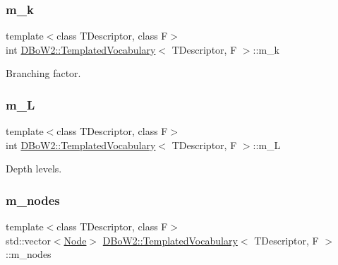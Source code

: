 \subsubsection{\texorpdfstring{m\+\_\+k}{m\_k}}
{\footnotesize\ttfamily template$<$class T\+Descriptor, class F$>$ \\
int \mbox{\hyperlink{class_d_bo_w2_1_1_templated_vocabulary}{D\+Bo\+W2\+::\+Templated\+Vocabulary}}$<$ T\+Descriptor, F $>$\+::m\+\_\+k\hspace{0.3cm}{\ttfamily [protected]}}



Branching factor. 

\mbox{\label{class_d_bo_w2_1_1_templated_vocabulary_a16735d9e2c8b901f01d541faea67971e}} 
\subsubsection{\texorpdfstring{m\+\_\+L}{m\_L}}
{\footnotesize\ttfamily template$<$class T\+Descriptor, class F$>$ \\
int \mbox{\hyperlink{class_d_bo_w2_1_1_templated_vocabulary}{D\+Bo\+W2\+::\+Templated\+Vocabulary}}$<$ T\+Descriptor, F $>$\+::m\+\_\+L\hspace{0.3cm}{\ttfamily [protected]}}



Depth levels. 

\mbox{\label{class_d_bo_w2_1_1_templated_vocabulary_a82be6d310eae6f4f57a72d340489320b}} 
\subsubsection{\texorpdfstring{m\+\_\+nodes}{m\_nodes}}
{\footnotesize\ttfamily template$<$class T\+Descriptor, class F$>$ \\
std\+::vector$<$\mbox{\hyperlink{struct_d_bo_w2_1_1_templated_vocabulary_1_1_node}{Node}}$>$ \mbox{\hyperlink{class_d_bo_w2_1_1_templated_vocabulary}{D\+Bo\+W2\+::\+Templated\+Vocabulary}}$<$ T\+Descriptor, F $>$\+::m\+\_\+nodes\hspace{0.3cm}{\ttfamily [protected]}}



